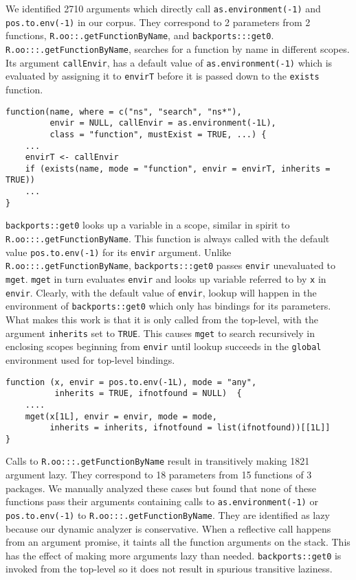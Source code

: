 \documentclass[review,nonacm,screen,acmsmall,anonymous=true]{acmart}
\newcommand{\code}[1]{\lstinline |#1|\xspace}
\begin{document}
%
We identified 2710 arguments which directly call \code{as.environment(-1)} and
\code{pos.to.env(-1)} in our corpus. They correspond to 2 parameters from 2
functions, \code{R.oo::.getFunctionByName}, and \code{backports:::get0}.
%
\code{R.oo:::.getFunctionByName}, searches for a function by
name in different scopes. Its argument \code{callEnvir}, has a default value of
\code{as.environment(-1)} which is evaluated by assigning it to \code{envirT}
before it is passed down to the \code{exists} function.
%
\begin{lstlisting}
function(name, where = c("ns", "search", "ns*"),
         envir = NULL, callEnvir = as.environment(-1L),
         class = "function", mustExist = TRUE, ...) {
    ...
    envirT <- callEnvir
    if (exists(name, mode = "function", envir = envirT, inherits = TRUE))
    ...
}
\end{lstlisting}
%
\code{backports::get0} looks up a variable in a scope, similar in spirit to
\code{R.oo:::.getFunctionByName}. This function is always called with the
default value \code{pos.to.env(-1)} for its \code{envir} argument. Unlike
\code{R.oo:::.getFunctionByName}, \code{backports:::get0} passes \code{envir}
unevaluated to \code{mget}. \code{mget} in turn evaluates \code{envir} and looks
up variable referred to by \code{x} in \code{envir}. Clearly, with the default
value of \code{envir}, lookup will happen in the environment of
\code{backports::get0} which only has bindings for its parameters. What makes
this work is that it is only called from the top-level, with the argument
\code{inherits} set to \code{TRUE}. This causes \code{mget} to search
recursively in enclosing scopes beginning from \code{envir} until lookup
succeeds in the \code{global} environment used for top-level bindings.
%
\begin{lstlisting}
function (x, envir = pos.to.env(-1L), mode = "any",
          inherits = TRUE, ifnotfound = NULL)  {
    ....
    mget(x[1L], envir = envir, mode = mode,
         inherits = inherits, ifnotfound = list(ifnotfound))[[1L]]
}
\end{lstlisting}
%
Calls to \code{R.oo:::.getFunctionByName} result in transitively making 1821
argument lazy. They correspond to 18 parameters from 15 functions of 3 packages.
We manually analyzed these cases but found that none of these functions pass
their arguments containing calls to \code{as.environment(-1)} or
\code{pos.to.env(-1)} to \code{R.oo:::.getFunctionByName}. They are identified
as lazy because our dynamic analyzer is conservative. When a reflective call
happens from an argument promise, it taints all the function arguments on the
stack. This has the effect of making more arguments lazy than needed.
%
\code{backports::get0} is invoked from the top-level so it does not result in
spurious transitive laziness.
\end{document}
